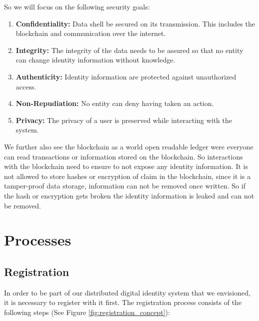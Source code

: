So we will focus on the following security goals:
\begin{enumerate}
\item \textbf{Confidentiality:} Data shell be secured on its transmission. This includes the blockchain and communication over the internet. 
\item \textbf{Integrity:} The integrity of the data needs to be assured so that no entity can change identity information without knowledge. 
\item \textbf{Authenticity:} Identity information are protected against unauthorized access. 
\item \textbf{Non-Repudiation:} No entity can deny having taken an action.
\item \textbf{Privacy:} The privacy of a user is preserved while interacting with the system. 
\end{enumerate}

We further also see the blockchain as a world open readable ledger were everyone can read transactions or information stored on the blockchain. So interactions with the blockchain need to ensure to not expose any identity information. 
It is not allowed to store hashes or encryption of claim in the blockchain, since it is a tamper-proof data storage, information can not be removed once written. So if the hash or encryption gets broken the identity information is leaked and can not be removed.  

\section{Processes}

\subsection{Registration}
In order to be part of our distributed digital identity system that we envisioned, it is necessary to register with it first. The registration process consists of the following steps (See Figure \ref{fig:registration_concept}):

